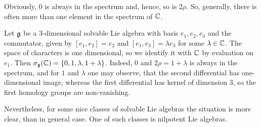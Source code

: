 Obviously, $0$ is always in the spectrum and, hence, so is $2\rho$. So,
generally, there is often more than one element in the spectrum of $\mathbb{C}$. 
\begin{example}
   Let $\mathfrak{g}$ be a 3-dimensional solvable Lie algebra with basis $e_1, e_2, e_3$ and the
   commutator, given by $[e_1, e_2] = e_2$ and $[e_1, e_3] = \lambda e_3$ for some $\lambda \in
   \mathbb{C}$. The space of characters is one dimensional, so we identify it with $\mathbb{C}$ by evaluation on
   $e_1$. Then $\sigma_{\mathfrak{g}}(\mathbb{C}) = \{0,1,\lambda, 1 + \lambda\}$. Indeed, $0$ and $2\rho = 1 +
   \lambda$ is always in the spectrum, and for $1$ and $\lambda$ one may observe, that the second
   differential has one-dimensional image, whereas the first differential has kernel of dimension
   $3$, so the first homology groups are non-vanishing.
\end{example}

Nevertheless, for some nice classes of solvable Lie
algebras the situation is more clear, than in general case. One of such classes is nilpotent Lie
algebras.

